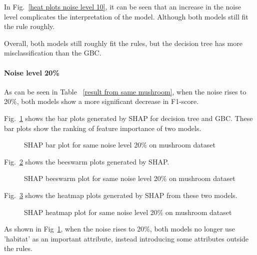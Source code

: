 \documentclass[runningheads,a4paper]{llncs}
\begin{document}
In Fig.~\ref{heat plots noise level 10}, it can be seen that an increase in the noise level complicates the interpretation of the model. Although both models still fit the rule roughly.

Overall, both models still roughly fit the rules, but the decision tree has more misclassification than the GBC.
\paragraph{Noise level 20\%}
As can be seen in Table ~\ref{result from same mushroom}, when the noise rises to 20\%, both models show a more significant decrease in F1-score.

Fig.~\ref{bar plots noise level 20} shows the bar plots generated by SHAP for decision tree and GBC. These bar plots show the ranking of feature importance of two models.
\begin{figure}[H]
	\centering
	
	\hfill
	
	
	\caption{SHAP bar plot for same noise level 20\% on mushroom dataset}
	\label{bar plots noise level 20}
\end{figure}
Fig.~\ref{bee plots noise level 20} shows the beeswarm plots generated by SHAP.
\begin{figure}[H]
	\centering
	
	\hfill
	
	
	\caption{SHAP beeswarm plot for same noise level 20\% on mushroom dataset}
	\label{bee plots noise level 20}
	
\end{figure}
Fig.~\ref{heat plots noise level 20} shows the heatmap plots generated by SHAP from these two models.
\begin{figure}[H]
	\centering
	
	\hfill
	
	
	\caption{SHAP heatmap plot for same noise level 20\% on mushroom dataset}
	\label{heat plots noise level 20}
	
\end{figure}
As shown in Fig~\ref{bar plots noise level 20}, when the noise rises to 20\%, both models no longer use 'habitat' as an important attribute, instead introducing some attributes outside the rules.
\end{document}
